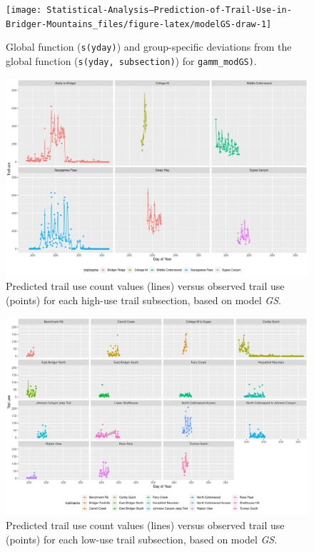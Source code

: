 \documentclass[
]{book}
\begin{document}
\begin{figure}

{\centering \texttt{[image: Statistical-Analysis--Prediction-of-Trail-Use-in-Bridger-Mountains\_files/figure-latex/modelGS-draw-1]} 

}

\caption{Global function (\texttt{s(yday)}) and group-specific deviations from the global function (\texttt{s(yday, subsection)}) for \texttt{gamm\_modGS)}. }\label{fig:modelGS-draw}
\end{figure}

\begin{figure}

{\centering \includegraphics[width=1\linewidth]{../figures/high_pred_modGS} 

}

\caption{Predicted trail use count values (lines) versus observed trail use (points) for each high-use trail subsection, based on model \emph{GS}.}\label{fig:high-pred-GS}
\end{figure}

\begin{figure}

{\centering \includegraphics[width=1\linewidth]{../figures/low_pred_modGS} 

}

\caption{Predicted trail use count values (lines) versus observed trail use (points) for each low-use trail subsection, based on model \emph{GS}.}\label{fig:low-pred-GS}
\end{figure}
\end{document}
